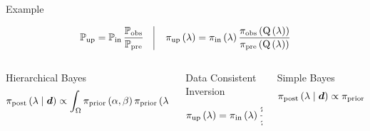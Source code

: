 



\begin{block}{Example}

\centering
\vspace{1cm}
    \begin{equation*}
            \dciP \quad \vline \quad \dci
    \end{equation*}
    


\begin{columns}
\begin{column}{\textwidth}
    Hierarchical Bayes
    \begin{equation*}
    \Hbayes
    \end{equation*}
    
\end{column}
\begin{column}{\textwidth}
  Data Consistent Inversion  
    \begin{equation*}
           \dci
    \end{equation*}
\end{column}

\begin{column}{\textwidth}
  Simple Bayes
    \begin{equation*}
           \bayes
    \end{equation*}
\end{column}
\separatorcolumn
\end{columns}


\end{block}





